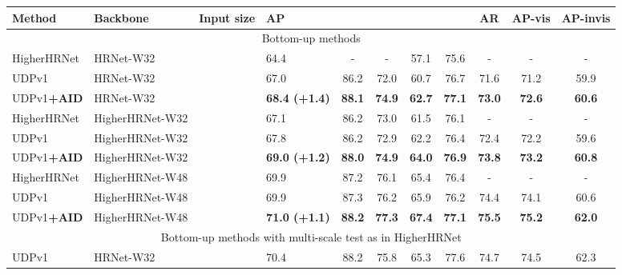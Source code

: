 \documentclass[final]{cvpr}
\begin{document}
\begin{table*}
\footnotesize
\begin{center}
\begin{tabular}{l|l|c|lccccccc}

\hline
Method                  & Backbone      &Input size        &AP  &  &  &  &    & AR  &AP-vis         &AP-invis\\
\hline
\multicolumn{11}{c}{Bottom-up methods}\\
\hline
HigherHRNet \cite{Higher}& HRNet-W32     &    &64.4                 & -             & -             & 57.1          &75.6           &-             &-              &-   \\
UDPv1 \cite{UDP}         & HRNet-W32     &    &67.0                 & 86.2          & 72.0          & 60.7          &76.7           &71.6          &71.2           &59.9\\
UDPv1\textbf{+AID}      & HRNet-W32     &    &\textbf{68.4 (+1.4)}  &\textbf{88.1}  &\textbf{74.9}  &\textbf{62.7}  &\textbf{77.1}  &\textbf{73.0} &\textbf{72.6}  &\textbf{60.6}\\
HigherHRNet \cite{Higher}& HigherHRNet-W32&   &67.1                 & 86.2          & 73.0          & 61.5          &76.1           & -            &-              &-   \\
UDPv1 \cite{UDP}         & HigherHRNet-W32&   &67.8                 & 86.2          & 72.9          & 62.2          &76.4           &72.4          &72.2           &59.6\\
UDPv1\textbf{+AID}      & HigherHRNet-W32&   &\textbf{69.0 (+1.2)}  &\textbf{88.0}  &\textbf{74.9}  &\textbf{64.0}  &\textbf{76.9}  &\textbf{73.8} &\textbf{73.2}  &\textbf{60.8}\\
HigherHRNet \cite{Higher}& HigherHRNet-W48&   &69.9                 & 87.2          & 76.1          & 65.4          &76.4           & -            &-              &-   \\
UDPv1 \cite{UDP}         & HigherHRNet-W48&   &69.9                 & 87.3          & 76.2          & 65.9          &76.2           &74.4          &74.1           &60.6\\
UDPv1\textbf{+AID}      & HigherHRNet-W48&   &\textbf{71.0 (+1.1)}  &\textbf{88.2}  &\textbf{77.3}  &\textbf{67.4}  &\textbf{77.1}  &\textbf{75.5} &\textbf{75.2}  &\textbf{62.0}\\
\hline
\multicolumn{11}{c}{Bottom-up methods with multi-scale test as in HigherHRNet \cite{Higher}}\\
\hline
UDPv1 \cite{UDP}         & HRNet-W32     &    &70.4                 & 88.2          & 75.8          & 65.3          &77.6           &74.7          &74.5              &62.3\\

\end{tabular}
\end{center}
\end{table*}
\end{document}
